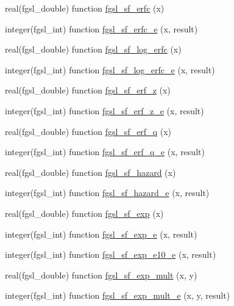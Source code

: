 \begin{DoxyCompactItemize}
\item 
real(fgsl\+\_\+double) function \hyperlink{specfunc_8finc_a14066e6dcb26748cffe3c3ea69ec2f35}{fgsl\+\_\+sf\+\_\+erfc} (x)
\item 
integer(fgsl\+\_\+int) function \hyperlink{specfunc_8finc_ab614e2480ee403c09e3220475ff4cdbd}{fgsl\+\_\+sf\+\_\+erfc\+\_\+e} (x, result)
\item 
real(fgsl\+\_\+double) function \hyperlink{specfunc_8finc_a3baa066f6192858ef58ad5f26a1719be}{fgsl\+\_\+sf\+\_\+log\+\_\+erfc} (x)
\item 
integer(fgsl\+\_\+int) function \hyperlink{specfunc_8finc_aba0192bba0eed7c77d0d6bd9bc1928b6}{fgsl\+\_\+sf\+\_\+log\+\_\+erfc\+\_\+e} (x, result)
\item 
real(fgsl\+\_\+double) function \hyperlink{specfunc_8finc_a095b336918f901f69eaca301fb143ace}{fgsl\+\_\+sf\+\_\+erf\+\_\+z} (x)
\item 
integer(fgsl\+\_\+int) function \hyperlink{specfunc_8finc_a85a48dea1aca3cacf4ecdc95d5d988e6}{fgsl\+\_\+sf\+\_\+erf\+\_\+z\+\_\+e} (x, result)
\item 
real(fgsl\+\_\+double) function \hyperlink{specfunc_8finc_a1b3c416f75498a3e96bd59bf0121ff45}{fgsl\+\_\+sf\+\_\+erf\+\_\+q} (x)
\item 
integer(fgsl\+\_\+int) function \hyperlink{specfunc_8finc_a269110d6eb74a848148b00764673225d}{fgsl\+\_\+sf\+\_\+erf\+\_\+q\+\_\+e} (x, result)
\item 
real(fgsl\+\_\+double) function \hyperlink{specfunc_8finc_a4bd454315927591d35336280b3ffc3d9}{fgsl\+\_\+sf\+\_\+hazard} (x)
\item 
integer(fgsl\+\_\+int) function \hyperlink{specfunc_8finc_a9cf498c10fe1a9fac6ae81e58d8fe620}{fgsl\+\_\+sf\+\_\+hazard\+\_\+e} (x, result)
\item 
real(fgsl\+\_\+double) function \hyperlink{specfunc_8finc_a043b6435a1861419db28f6e918e981d7}{fgsl\+\_\+sf\+\_\+exp} (x)
\item 
integer(fgsl\+\_\+int) function \hyperlink{specfunc_8finc_a7963c74fa729d05029c56d547d96990e}{fgsl\+\_\+sf\+\_\+exp\+\_\+e} (x, result)
\item 
integer(fgsl\+\_\+int) function \hyperlink{specfunc_8finc_a88816c6d5ff5472450226157f7c8f090}{fgsl\+\_\+sf\+\_\+exp\+\_\+e10\+\_\+e} (x, result)
\item 
real(fgsl\+\_\+double) function \hyperlink{specfunc_8finc_a089388c68bea55ad034bfbc8d250b3ad}{fgsl\+\_\+sf\+\_\+exp\+\_\+mult} (x, y)
\item 
integer(fgsl\+\_\+int) function \hyperlink{specfunc_8finc_a6e78d00e401f995d4d3365406c561b2f}{fgsl\+\_\+sf\+\_\+exp\+\_\+mult\+\_\+e} (x, y, result)

\end{DoxyCompactItemize}

